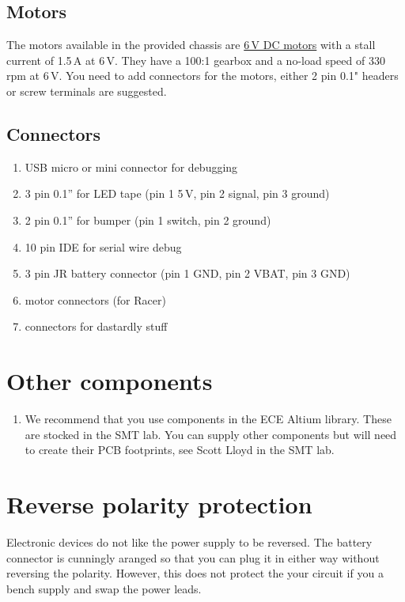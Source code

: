 \subsection{Motors}

The motors available in the provided chassis are
\href{https://www.pololu.com/product/3065}{6\,V DC motors} with a
stall current of 1.5\,A at 6\,V.  They have a 100:1 gearbox and a
no-load speed of 330\,rpm at 6\,V.  You need to add connectors for the
motors, either 2 pin 0.1" headers or screw terminals are suggested.


\subsection{Connectors}

\begin{enumerate}
\item USB micro or mini connector for debugging
\item 3 pin 0.1'' for LED tape (pin 1 5\,V, pin 2 signal, pin 3 ground)
\item 2 pin 0.1'' for bumper (pin 1 switch, pin 2 ground)
\item 10 pin IDE for serial wire debug
\item 3 pin JR battery connector (pin 1 GND, pin 2 VBAT, pin 3 GND)
\item motor connectors (for Racer)
\item connectors for dastardly stuff
\end{enumerate}


\section{Other components}

\begin{enumerate}
\item We recommend that you use components in the ECE Altium library.
  These are stocked in the SMT lab.  You can supply other components
  but will need to create their PCB footprints, see Scott Lloyd in the
  SMT lab.
\end{enumerate}


\section{Reverse polarity protection}

Electronic devices do not like the power supply to be reversed.  The
battery connector is cunningly aranged so that you can plug it in
either way without reversing the polarity.  However, this does not
protect the your circuit if you a bench supply and swap the power
leads.

